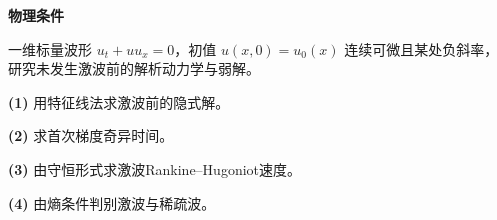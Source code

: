 \textbf{物理条件}\par 一维标量波形 \(u_t+uu_x=0\)，初值 \(u(x,0)=u_0(x)\) 连续可微且某处负斜率，研究未发生激波前的解析动力学与弱解。
\par\noindent\textbf{(1)} 用特征线法求激波前的隐式解。
\par\noindent\textbf{(2)} 求首次梯度奇异时间。
\par\noindent\textbf{(3)} 由守恒形式求激波Rankine–Hugoniot速度。
\par\noindent\textbf{(4)} 由熵条件判别激波与稀疏波。
